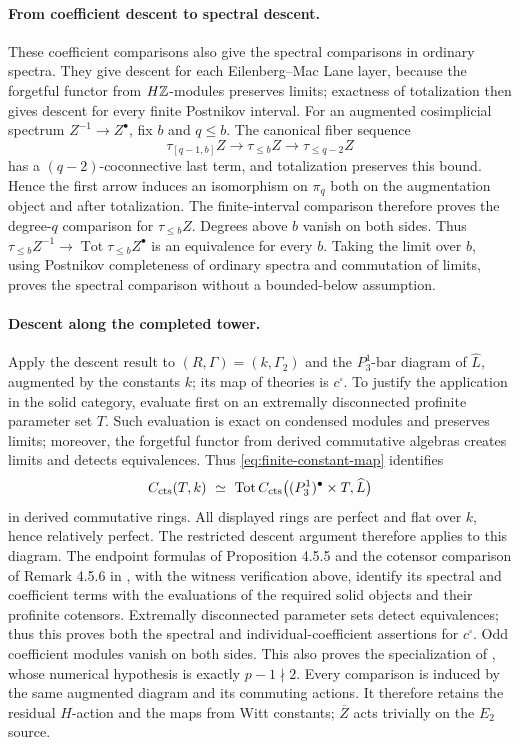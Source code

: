 \paragraph{From coefficient descent to spectral descent.}
These coefficient comparisons also give the spectral comparisons in
ordinary spectra. They give descent for each Eilenberg--Mac Lane
layer, because the forgetful functor from $H\mathbb Z$-modules preserves limits;
exactness of totalization then gives descent for every finite Postnikov
interval. For an augmented cosimplicial spectrum
$Z^{-1}\to Z^\bullet$, fix $b$ and $q\leq b$. The canonical fiber sequence
\[
 \tau_{[q-1,b]}Z\longrightarrow\tau_{\leq b}Z
       \longrightarrow\tau_{\leq q-2}Z
\]
has a $(q-2)$-coconnective last term, and totalization preserves this
bound. Hence the first arrow induces an isomorphism on $\pi_q$ both on
the augmentation object and after totalization. The finite-interval
comparison therefore proves the degree-$q$ comparison for
$\tau_{\leq b}Z$. Degrees above $b$ vanish on both sides.
Thus $\tau_{\leq b}Z^{-1}\to\operatorname{Tot}\tau_{\leq b}Z^\bullet$
is an equivalence for every $b$. Taking the limit over $b$, using
Postnikov completeness of ordinary spectra and commutation of limits,
proves the spectral comparison without a bounded-below assumption.

\paragraph{Descent along the completed tower.}
Apply the descent result to \((R,\Gamma)=(k,\Gamma_2)\) and the
\(P_3^1\)-bar diagram of \(\widehat L\), augmented by the constants
\(k\); its map of theories is \(c^\square\). To justify the application
in the solid category, evaluate first on an extremally
disconnected profinite parameter set $T$.  Such evaluation is exact on
condensed modules and preserves limits; moreover, the forgetful functor
from derived commutative algebras creates limits and detects equivalences.
Thus \eqref{eq:finite-constant-map} identifies
\[
 C_{\mathrm{cts}}(T,k)\ \simeq\
 \operatorname{Tot}
 C_{\mathrm{cts}}\bigl((P_3^1)^{\bullet}\times T,\widehat L\bigr)
\]
in derived commutative rings.  All displayed rings are perfect and
flat over $k$, hence relatively perfect. The restricted descent argument
therefore applies to this diagram. The endpoint formulas of
Proposition 4.5.5 and the cotensor comparison of Remark 4.5.6 in
\cite{BMR2026}, with the witness verification above, identify its
spectral and coefficient terms with the evaluations of the required
solid objects and their profinite cotensors. Extremally
disconnected parameter sets detect equivalences; thus this proves both
the spectral and individual-coefficient assertions for \(c^\square\).
Odd coefficient modules vanish on both sides.  This also proves the
specialization of \cite[Theorem 5.2.6]{BMR2026}, whose numerical
hypothesis is exactly $p-1\nmid2$.
Every comparison is induced by the same augmented diagram and its
commuting actions. It therefore retains the residual \(H\)-action and
the maps from Witt constants; \(\overline Z\) acts trivially on the
\(E_2\) source.

